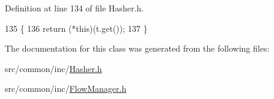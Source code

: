 Definition at line 134 of file Hasher.\-h.


\begin{DoxyCode}
135     \{
136         \textcolor{keywordflow}{return} (*\textcolor{keyword}{this})(t.get());
137     \}
\end{DoxyCode}


The documentation for this class was generated from the following files\-:\begin{DoxyCompactItemize}
\item 
src/common/inc/\hyperlink{_hasher_8h}{Hasher.\-h}\item 
src/common/inc/\hyperlink{_flow_manager_8h}{Flow\-Manager.\-h}\end{DoxyCompactItemize}
